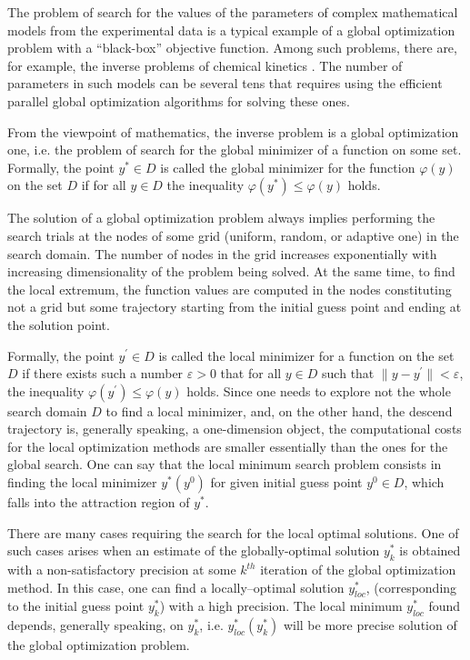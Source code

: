 \documentclass[runningheads]{llncs}
\begin{document}
The problem of search for the values of the parameters of complex mathematical models from the experimental data is a typical example of a global optimization problem with a ``black-box'' objective function. Among such problems, there are, for example, the inverse problems of chemical kinetics \cite{Akhmadullina2017,Nurislamova2016}. The number of parameters in such models can be several tens that requires using the efficient parallel global optimization algorithms for solving these ones.

From the viewpoint of mathematics, the inverse problem is a global optimization one, i.e. the problem of search for the global minimizer of a function on some set. Formally, the point $y^{*} \in D$ is called the global minimizer for the function $\varphi(y)$ on the set $D$ if for all $y \in D$ the inequality $\varphi(y^{*}) \leq \varphi(y)$ holds.

The solution of a global optimization problem always implies performing the search trials at the nodes of some grid (uniform, random, or adaptive one) in the search domain. The number of nodes in the grid increases exponentially with increasing dimensionality of the problem being solved. At the same time, to find the local extremum, the function values are computed in the nodes constituting not a grid but some trajectory starting from the initial guess point and ending at the solution point. 

Formally, the point $y^{\prime} \in D$ is called the local minimizer for a function on the set $D$ if there exists such a number $\varepsilon > 0$ that for all $y \in D$ such that $\|y - y^{\prime}\| < \varepsilon$, the inequality $\varphi(y^{\prime}) \leq \varphi(y)$ holds. Since one needs to explore not the whole search domain $D$ to find a local minimizer, and, on the other hand, the descend trajectory is, generally speaking, a one-dimension object, the computational costs for the local optimization methods are smaller essentially than the ones for the global search.
One can say that the local minimum search problem consists in finding the local minimizer $y^{*}(y^{0})$ for given initial guess point $y^{0} \in D$, which falls into the attraction region of $y^{*}$.

There are many cases requiring the search for the local optimal solutions. One of such cases arises when an estimate of the globally-optimal solution $y_k^*$ is obtained with a non-satisfactory precision at some $k^{th}$ iteration of the global optimization method. In this case, one can find a locally–optimal solution $y_{loc}^*$, (corresponding to the initial guess point $y_k^*$) with a high precision. The local minimum $y_{loc}^*$ found depends, generally speaking, on $y_k^*$, i.e. $y_{loc}^*(y_k^*)$ will be more precise solution of the global optimization problem.
\end{document}
